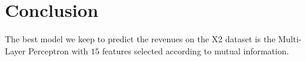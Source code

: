 \section{Conclusion}

The best model we keep to predict the revenues on the X2 dataset is the Multi-Layer Perceptron with $15$ features selected according to mutual information.